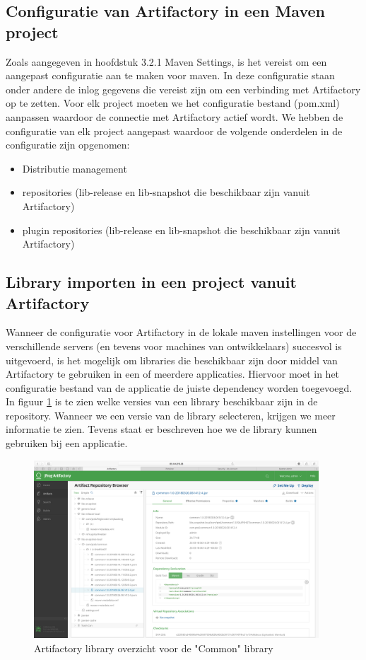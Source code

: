 \subsection{Configuratie van Artifactory in een Maven project}
Zoals aangegeven in hoofdstuk 3.2.1 Maven Settings, is het vereist om een aangepast configuratie aan te maken voor maven. In deze configuratie staan onder andere de inlog gegevens die vereist zijn om een verbinding met Artifactory op te zetten.
\newline
Voor elk project moeten we het configuratie bestand (pom.xml) aanpassen waardoor de connectie met Artifactory actief wordt. We hebben de configuratie van elk project aangepast waardoor de volgende onderdelen in de configuratie zijn opgenomen: 
\begin{itemize}
	\setlength\itemsep{0em}
	\item Distributie management
	\item repositories (lib-release en lib-snapshot die beschikbaar zijn vanuit Artifactory)
	\item plugin repositories (lib-release en lib-snapshot die beschikbaar zijn vanuit Artifactory)
\end{itemize}

\subsection{Library importen in een project vanuit Artifactory}
Wanneer de configuratie voor Artifactory in de lokale maven instellingen voor de verschillende servers (en tevens voor machines van ontwikkelaars) succesvol is uitgevoerd, is het mogelijk om libraries die beschikbaar zijn door middel van Artifactory te gebruiken in een of meerdere applicaties. Hiervoor moet in het configuratie bestand van de applicatie de juiste dependency worden toegevoegd.
\newline
In figuur \ref{fig:ArtifactoryDependencyManagement} is te zien welke versies van een library beschikbaar zijn in de repository. Wanneer we een versie van de library selecteren, krijgen we meer informatie te zien. Tevens staat er beschreven hoe we de library kunnen gebruiken bij een applicatie.

\begin{figure}[H]
	\centering
	\includegraphics[width=0.95\textwidth]{img/ArtifactoryDependencyManagement.png}
	\caption{Artifactory library overzicht voor de "Common" library}
	\label{fig:ArtifactoryDependencyManagement}
\end{figure}